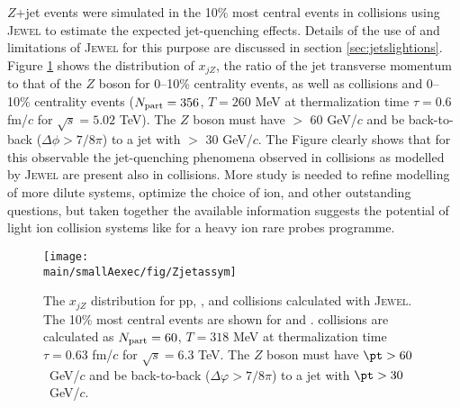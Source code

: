 $Z$+jet events were simulated in the 10\% most central events in \ArAr collisions using J\textsc{ewel} \cite{Zapp:2009ud} to estimate the expected jet-quenching effects.  Details of the use of and limitations of J\textsc{ewel} for this purpose are discussed in section \ref{sec:jetslightions}. Figure \ref{fig:ArAr_xjz} shows the distribution of $x_{jZ}$, the ratio of the jet transverse momentum to that of the $Z$ boson for 0--10\% centrality \ArAr events, as well as \pp collisions and 0--10\% centrality \PbPb events ($N_{\rm part} = 356$, $T=260$ MeV at thermalization time $\tau = 0.6$ fm/$c$ for $\sqrt{s}=5.02$ TeV).  The $Z$ boson must have \pt $>$ 60 GeV/$c$ and be back-to-back ($\Delta\phi > 7/8\pi$) to a jet with \pt $>$ 30 GeV/$c$.  The Figure clearly shows that for this observable the jet-quenching phenomena observed in \PbPb collisions as modelled by J\textsc{ewel} are present also in \ArAr collisions.  More study is needed to refine modelling of more dilute systems, optimize the choice of ion, and other outstanding questions, but taken together the available information suggests %
the potential of light ion collision systems like \ArAr for a heavy ion rare probes programme.%
\begin{figure}
\centering
\texttt{[image: \\main/smallAexec/fig/Zjetassym]}
\caption{
The $x_{jZ}$ distribution for pp, \PbPb, and \ArAr collisions calculated with J\textsc{ewel}.  The 10\% most central events are shown for \PbPb and \ArAr.  \ArAr collisions are calculated as $N_{\rm part} = 60$, $T=318$ MeV at thermalization time $\tau = 0.63$ fm/$c$ for $\sqrt{s}=6.3$ TeV.  The $Z$ boson must have $\pt > 60$~GeV/$c$ and be back-to-back ($\Delta\varphi > 7/8\pi$) to a jet with $\pt > 30$~GeV/$c$.    
\label{fig:ArAr_xjz}}
\end{figure}